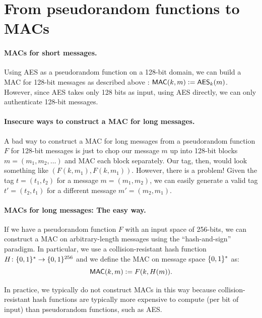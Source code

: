 \section{From pseudorandom functions to MACs}

\paragraph{MACs for short messages.}
Using AES as a pseudorandom function on a 128-bit domain,
we can build a MAC for 128-bit messages as described above
: $\mathsf{MAC}(k, m) \mathrel{\mathop:}= \mathsf{AES}_k(m)$. 
However, since AES takes only 128 bits as input, using AES
directly, we can only authenticate 128-bit messages. 

\paragraph{Insecure ways to construct a MAC for long messages.}
A bad way to construct a MAC for long messages from a pseudorandom 
function $F$ for 128-bit messages is
just to chop our message $m$ up into 128-bit blocks
$m = (m_1, m_2, \dots)$
and MAC each block separately.
Our tag, then, would look something like $\left(F(k,m_1), F(k,m_1)\right)$.
However, there is a problem! Given the tag $t = (t_1, t_2)$ for a message $m=(m_1, m_2)$, we can easily generate a valid tag 
$t' = (t_2, t_1)$ for a different message $m'=(m_2, m_1)$. 

\paragraph{MACs for long messages: The easy way.}
If we have a pseudorandom function $F$ with an input space of 256-bits,
we can construct a MAC on arbitrary-length messages using the ``hash-and-sign'' paradigm.
In particular, we use a collision-resistant hash function $H\colon \{0,1\}^* \to \{0,1\}^{256}$ 
and we define the MAC on message space $\{0,1\}^*$ as:
\[ \mathsf{MAC}(k,m) \mathrel{\mathop:}= F(k, H(m)).\]


In practice, we typically do not construct MACs in this way because
collision-resistant hash functions are typically more expensive to
compute (per bit of input) than pseudorandom functions, such as AES.

